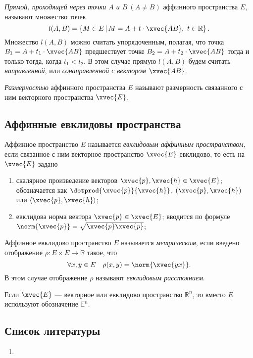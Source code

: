 \begin{definition}
  \textit{Прямой, проходящей через точки $A$ и $B~(A \neq B)$} аффинного
  пространства $E$, называют множество точек
  \begin{equation*}
    l(A,B) = \left\{ M \in E \, | \, M = A + t \cdot \xvec{AB},~t \in \mathbb{R}
    \right\}.
  \end{equation*}
  Множество $l(A,B)$ можно считать упорядоченным, полагая, что точка $B_1 = A +
  t_1 \cdot \xvec{AB}$ предшествует точке $B_2 = A + t_2 \cdot \xvec{AB}$ тогда
  и только тогда, когда $t_1 < t_2$. В этом случае прямую $l(A,B)$ будем считать
  \textit{направленной}, или \textit{сонаправленной с вектором $\xvec{AB}$}.
\end{definition}

\begin{definition}
  \textit{Размерностью} аффинного пространства $E$ называют размерность
  связанного с ним векторного пространства $\xvec{E}$.
\end{definition}

\subsection{Аффинные евклидовы пространства}

\begin{definition}
  Аффинное пространство $E$ называется \textit{евклидовым аффинным
  пространством}, если связанное с ним векторное пространство $\xvec{E}$
  евклидово, то есть на $\xvec{E}$ задано
  \begin{enumerate}
    \item скалярное произведение векторов $\xvec{p}, \xvec{h} \in \xvec{E}$;
      обозначается как $\dotprod{\xvec{p}}{\xvec{h}},~(\xvec{p},\xvec{h})$ или
      $\left\langle \xvec{p},\xvec{h} \right\rangle$;
    \item евклидова норма вектора $\xvec{p} \in \xvec{E}$; вводится по формуле
      $\norm{\xvec{p}} = \sqrt{\xvec{p}\xvec{p}}$;
  \end{enumerate}
\end{definition}

\begin{definition}
  Аффинное евклидово пространство $E$ называется \textit{метрическим}, если
  введено отображение $\rho : E \times E \to \mathbb{R}$ такое, что
  \begin{equation*}
    \forall x,y \in E \quad \rho(x,y) = \norm{\xvec{yx}}.
  \end{equation*}
  В этом случае отображение $\rho$ называют \textit{евклидовым расстоянием}.
\end{definition}

Если $\xvec{E}$ --- векторное или евклидово пространство $\mathbb{R}^n$, то
вместо $E$ используют обозначение $\mathbb{E}^n$.

\subsection{Список литературы}
\begin{enumerate}
  \item \cite{lectures}
\end{enumerate}

